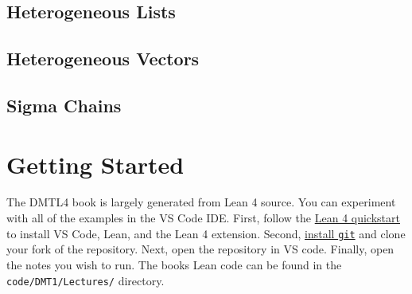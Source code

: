 \documentclass{book}
\begin{document}
\hypertarget{book__pandoc__debug__src__dmt1__lectures__l11_typeheterogeneity__c04_heterolist.lean.md}{}
\hypertarget{book__pandoc__debug__src__dmt1__lectures__l11_typeheterogeneity__c04_heterolist.lean.md__heterogeneous-lists}{%
\section{Heterogeneous Lists}\label{book__pandoc__debug__src__dmt1__lectures__l11_typeheterogeneity__c04_heterolist.lean.md__heterogeneous-lists}}

\hypertarget{book__pandoc__debug__src__dmt1__lectures__l11_typeheterogeneity__c05_heterovector.lean.md}{}
\hypertarget{book__pandoc__debug__src__dmt1__lectures__l11_typeheterogeneity__c05_heterovector.lean.md__heterogeneous-vectors}{%
\section{Heterogeneous Vectors}\label{book__pandoc__debug__src__dmt1__lectures__l11_typeheterogeneity__c05_heterovector.lean.md__heterogeneous-vectors}}

\hypertarget{book__pandoc__debug__src__dmt1__lectures__l11_typeheterogeneity__c06_sigmachain.lean.md}{}
\hypertarget{book__pandoc__debug__src__dmt1__lectures__l11_typeheterogeneity__c06_sigmachain.lean.md__sigma-chains}{%
\section{Sigma Chains}\label{book__pandoc__debug__src__dmt1__lectures__l11_typeheterogeneity__c06_sigmachain.lean.md__sigma-chains}}

\hypertarget{book__pandoc__debug__src__build.md}{}
\hypertarget{book__pandoc__debug__src__build.md__getting-started}{%
\chapter*{Getting Started}\label{book__pandoc__debug__src__build.md__getting-started}}

The DMTL4 book is largely generated from Lean 4 source. You can experiment with
all of the examples in the VS Code IDE. First, follow the \href{https://lean-lang.org/lean4/doc/quickstart.html}{Lean 4 quickstart} to
install VS Code, Lean, and the Lean 4 extension. Second, \href{https://github.com/git-guides/install-git}{install \texttt{git}} and
clone your fork of the repository. Next, open the repository in VS code.
Finally, open the notes you wish to run. The book\textquotesingle s Lean code can be found in the
\texttt{code/DMT1/Lectures/} directory.
\end{document}
